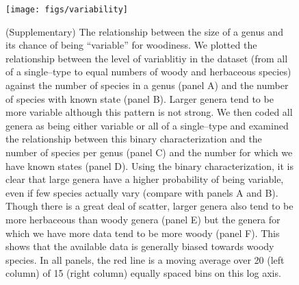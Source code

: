 \documentclass[a4paper,12pt]{article}
\begin{document}
\begin{figure}[p]
  \centering
  \texttt{[image: figs/variability]}
  \caption{(Supplementary) The relationship between the size of a genus
and its chance of being ``variable'' for woodiness.
%
We plotted the relationship between the level of variablitiy in the
dataset (from all of a single--type to equal numbers of woody and
herbaceous species) against the number of species in a genus (panel A)
and the number of species with known state (panel B). Larger genera
tend to be more variable although this pattern is not strong. We then
coded all genera as being either variable or all of a single--type and
examined the relationship between this binary characterization and the
number of species per genus (panel C) and the number for which we
have known states (panel D). Using the binary characterization, it is
clear that large genera have a higher probability of being variable,
even if few species actually vary (compare with panels A and
B). Though there is a great deal of scatter, larger genera also tend to be
more herbaceous than woody genera (panel E) but the genera for which
we have more data tend to be more woody (panel F). This shows that the
available data is generally biased towards woody species.  In all
panels, the red line is a moving average over 20 (left column) of 15 (right
column) equally spaced bins on this log axis.}
  \label{fig:variability}
\end{figure}
\end{document}
